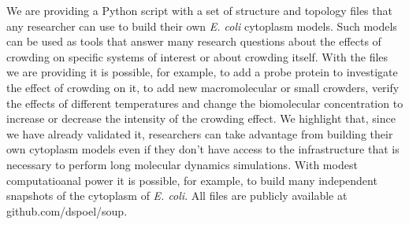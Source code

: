\documentclass[journal=jacsat,manuscript=article]{achemso}
\begin{document}
We are providing a Python script with a set of structure and topology files that any researcher can use to build their own \textit{E. coli} cytoplasm models. Such models can be used as tools that answer many research questions about the effects of crowding on specific systems of interest or about crowding itself. With the files we are providing it is possible, for example, to add a probe protein to investigate the effect of crowding on it, to add new macromolecular or small crowders, verify the effects of different temperatures and change the biomolecular concentration to increase or decrease the intensity of the crowding effect. We highlight that, since we have already validated it, researchers can take advantage from building their own cytoplasm models even if they don't have access to the infrastructure that is necessary to perform long molecular dynamics simulations. With modest computatioanal power it is possible, for example, to build many independent snapshots of the cytoplasm of \textit{E. coli}. All files are publicly available at github.com/dspoel/soup.

 


 
\end{document}
